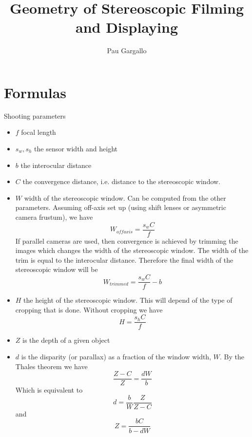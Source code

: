 \documentclass[12pt,a4paper]{article}
\begin{document}
\title{Geometry of Stereoscopic Filming and Displaying}
\author{Pau Gargallo}
\maketitle

\section{Formulas}
Shooting parameters
\begin{itemize}
 \item $f$ focal length
 \item $s_w, s_h$ the sensor width and height
 \item $b$ the interocular distance
 \item $C$ the convergence distance, i.e. distance to the stereoscopic window.
 \item $W$ width of the stereoscopic window. Can be computed from the other parameters. Assuming off-axis set up (using shift lenses or asymmetric camera frustum), we have
 \begin{equation}
  W_{offaxis} = \frac{s_w C}{f}
 \end{equation}
 If parallel cameras are used, then convergence is achieved by trimming the images which changes the width of the stereoscopic window. The width of the trim is equal to the interocular distance. Therefore the final width of the stereoscopic window will be
 \begin{equation}
  W_{trimmed} = \frac{s_w C}{f} - b
 \end{equation}
 \item $H$ the height of the stereoscopic window. This will depend of the type of cropping that is done. Without cropping we have
\begin{equation}
  H = \frac{s_h C}{f}
 \end{equation} 
 \item $Z$ is the depth of a given object
 \item $d$ is the disparity (or parallax) as a fraction of the window width, $W$.  By the Thales theorem we have
 \begin{equation}
  \frac{Z - C}{Z} = \frac{dW}{b}
 \end{equation}
 Which is equivalent to
 \begin{equation}
  d = \frac{b}{W} \frac{Z}{Z-C}
 \end{equation}
 and
 \begin{equation}
  Z = \frac{bC}{b - dW}
 \end{equation} 
\end{itemize}
\end{document}
